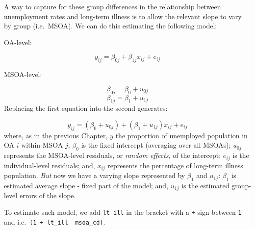 \documentclass[
  letterpaper,
  krantz2]{style/krantz}
\newenvironment{Shaded}{\begin{snugshade}}{\end{snugshade}}
\newcommand{\AttributeTok}[1]{\textcolor[rgb]{0.40,0.45,0.13}{#1}}
\newcommand{\CommentTok}[1]{\textcolor[rgb]{0.37,0.37,0.37}{#1}}
\newcommand{\DecValTok}[1]{\textcolor[rgb]{0.68,0.00,0.00}{#1}}
\newcommand{\FunctionTok}[1]{\textcolor[rgb]{0.28,0.35,0.67}{#1}}
\newcommand{\NormalTok}[1]{\textcolor[rgb]{0.00,0.23,0.31}{#1}}
\newcommand{\OtherTok}[1]{\textcolor[rgb]{0.00,0.23,0.31}{#1}}
\newcommand{\SpecialCharTok}[1]{\textcolor[rgb]{0.37,0.37,0.37}{#1}}
\begin{document}
A way to capture for these group differences in the relationship between
unemployment rates and long-term illness is to allow the relevant slope
to vary by group (i.e.~MSOA). We can do this estimating the following
model:

OA-level:

\[y_{ij} = \beta_{0j} + \beta_{1j}x_{ij} + e_{ij}\]

MSOA-level:

\[\beta_{0j} = \beta_{0} + u_{0j}\] \[\beta_{1j} = \beta_{1} + u_{1j} \]
Replacing the first equation into the second generates:

\[y_{ij} = (\beta_{0} + u_{0j}) + (\beta_{1} + u_{1j})x_{ij} + e_{ij}\]
where, as in the previous Chapter, \(y\) the proportion of unemployed
population in OA \(i\) within MSOA \(j\); \(\beta_{0}\) is the fixed
intercept (averaging over all MSOAs); \(u_{0j}\) represents the
MSOA-level residuals, or \emph{random effects}, of the intercept;
\(e_{ij}\) is the individual-level residuals; and, \(x_{ij}\) represents
the percentage of long-term illness population. \emph{But} now we have a
varying slope represented by \(\beta_{1}\) and \(u_{1j}\): \(\beta_{1}\)
is estimated average slope - fixed part of the model; and, \(u_{1j}\) is
the estimated group-level errors of the slope.

To estimate such model, we add \texttt{lt\_ill} in the bracket with a
\texttt{+} sign between \texttt{1} and \texttt{\textbar{}}
i.e.~\texttt{(1\ +\ lt\_ill\ \textbar{}\ msoa\_cd)}.

\begin{Shaded}
\end{Shaded}
\end{document}
